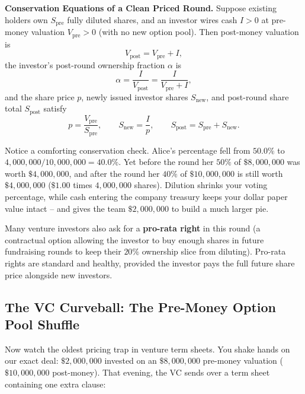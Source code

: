 \begin{formalbox}
\textbf{Conservation Equations of a Clean Priced Round.}
Suppose existing holders own $S_{\text{pre}}$ fully diluted shares, and an investor wires cash $I > 0$ at pre-money valuation $V_{\text{pre}} > 0$ (with no new option pool). Then post-money valuation is
\begin{equation}\label{eq:post-money}
  V_{\text{post}} = V_{\text{pre}} + I,
\end{equation}
the investor's post-round ownership fraction $\alpha$ is
\begin{equation}\label{eq:investor-fraction}
  \alpha = \frac{I}{V_{\text{post}}} = \frac{I}{V_{\text{pre}} + I},
\end{equation}
and the share price $p$, newly issued investor shares $S_{\text{new}}$, and post-round share total $S_{\text{post}}$ satisfy
\begin{equation}\label{eq:pps-and-new-shares}
  p = \frac{V_{\text{pre}}}{S_{\text{pre}}}, \qquad
  S_{\text{new}} = \frac{I}{p}, \qquad
  S_{\text{post}} = S_{\text{pre}} + S_{\text{new}}.
\end{equation}
\end{formalbox}

Notice a comforting conservation check. Alice's percentage fell from $50.0\%$ to $4{,}000{,}000 / 10{,}000{,}000 = 40.0\%$. Yet before the round her $50\%$ of $\$8{,}000{,}000$ was worth $\$4{,}000{,}000$, and after the round her $40\%$ of $\$10{,}000{,}000$ is still worth $\$4{,}000{,}000$ ($\$1.00$ times $4{,}000{,}000$ shares). Dilution shrinks your voting percentage, while cash entering the company treasury keeps your dollar paper value intact -- and gives the team $\$2{,}000{,}000$ to build a much larger pie.

Many venture investors also ask for a \textbf{pro-rata right} in this round (a contractual option allowing the investor to buy enough shares in future fundraising rounds to keep their $20\%$ ownership slice from diluting). Pro-rata rights are standard and healthy, provided the investor pays the full future share price alongside new investors.

\subsection{The VC Curveball: The Pre-Money Option Pool Shuffle}
\label{sec:option-pool-shuffle}

Now watch the oldest pricing trap in venture term sheets. You shake hands on our exact deal: $\$2{,}000{,}000$ invested on an $\$8{,}000{,}000$ pre-money valuation ($\$10{,}000{,}000$ post-money). That evening, the VC sends over a term sheet containing one extra clause:


